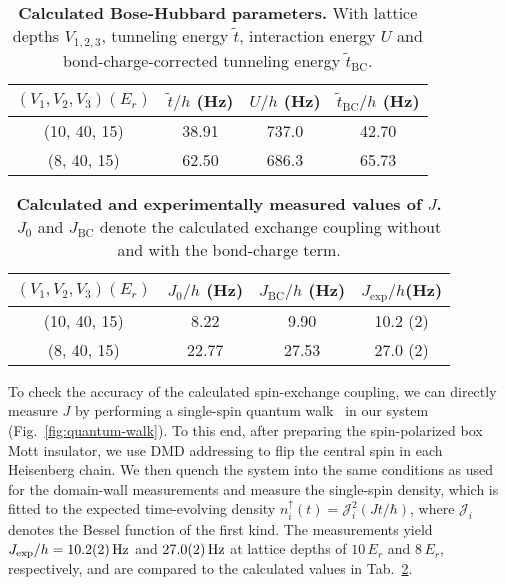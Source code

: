 \documentclass[
 reprint,
 superscriptaddress,
 amsmath,amssymb,
 aps,
 pra,
]{revtex4-2}
\begin{document}
\begin{table}
    \centering
    \setlength{\extrarowheight}{2pt}
    \begin{tabular}{|c|c|c|c|}
        \hline
        $(V_1, V_2, V_3) (E_r)$ & $\tilde{t}/h$ (Hz)& $U/h$ (Hz) & $\tilde{t}_\mathrm{BC}/h$ (Hz) \\
        \hline
        (10, 40, 15)            & 38.91             & 737.0    & 42.70                          \\
        (8, 40, 15)             & 62.50             & 686.3    & 65.73                          \\
        \hline
    \end{tabular}
    \caption{\textbf{Calculated Bose-Hubbard parameters.}
        With lattice depths $V_{1,2,3}$, tunneling energy $\tilde{t}$, interaction energy $U$ and bond-charge-corrected tunneling energy $\tilde{t}_\mathrm{BC}$.
    }
    \label{tab:BH}
\end{table}

\begin{table}
    \centering
    \setlength{\extrarowheight}{2pt}
    \begin{tabular}{|c|c|c|c|}
        \hline
        $(V_1, V_2, V_3) (E_r)$ & $J_\mathrm{0}/h$ (Hz) & $J_\mathrm{BC}/h$ (Hz) & $J_\mathrm{exp}/h$(Hz) \\
        \hline
        (10, 40, 15)            &  8.22                 &  9.90                  & 10.2 (2)               \\
        (8, 40, 15)             & 22.77                 & 27.53                  & 27.0 (2)               \\
        \hline
    \end{tabular}
    \caption{\textbf{Calculated and experimentally measured values of $J$.}
        $J_\mathrm{0}$ and $J_\mathrm{BC}$ denote the calculated exchange coupling without and with the bond-charge term.
    }
    \label{tab:HP}
\end{table}



To check the accuracy of the calculated spin-exchange coupling, we can directly measure $J$ by performing a single-spin quantum walk~\cite{Fukuhara2013} in our system (Fig.~\ref{fig:quantum-walk}). To this end, after preparing the spin-polarized box Mott insulator, we use DMD addressing to flip the central spin in each Heisenberg chain. We then quench the system into the same conditions as used for the domain-wall measurements and measure the single-spin density, which is fitted to the expected time-evolving density $n_i^\uparrow (t) = \mathcal{J}_i^2 (J t / \hbar)$, where $\mathcal{J}_i$ denotes the Bessel function of the first kind. The measurements yield $J_\mathrm{exp} / h = \SI{10.2 (2)}{Hz}$ and $\SI{27.0 (2)}{Hz}$ at lattice depths of $10\,E_r$ and $8\,E_r$, respectively, and are compared to the calculated values in Tab.~\ref{tab:HP}.
\end{document}
